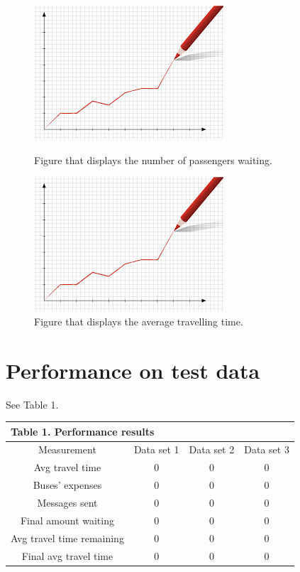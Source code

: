 \documentclass{article}
\begin{document}
\begin{figure}
\centering
\begin{minipage}{.5\textwidth}
  \includegraphics[width=.4\linewidth]{nr_pass_waiting.jpg}
  \caption{\label{fig:pass_waiting}Figure that displays the number of passengers waiting.}
\end{minipage}%
\begin{minipage}{.5\textwidth}
  \includegraphics[width=.4\linewidth]{avg_tt.jpg}
  \caption{\label{fig:avg_tt}Figure that displays the average travelling time.}
\end{minipage}
\end{figure}

\section{Performance on test data}

See Table 1.

\begin{table}
\begin{tabular}{ |c|c|c|c|  }
 \hline
 \multicolumn{4}{|l|}{Table 1. Performance results} \\
 \hline
  Measurement & Data set 1 & Data set 2 & Data set 3 \\
 \hline
  Avg travel time & 0 & 0 & 0\\
  Buses' expenses & 0 & 0 & 0\\
  Messages sent & 0 & 0 & 0\\
  Final amount waiting & 0 & 0 & 0\\
  Avg travel time remaining & 0 & 0 & 0\\
  Final avg travel time & 0 & 0 & 0\\
 \hline
\end{tabular}
\end{table}
\end{document}
